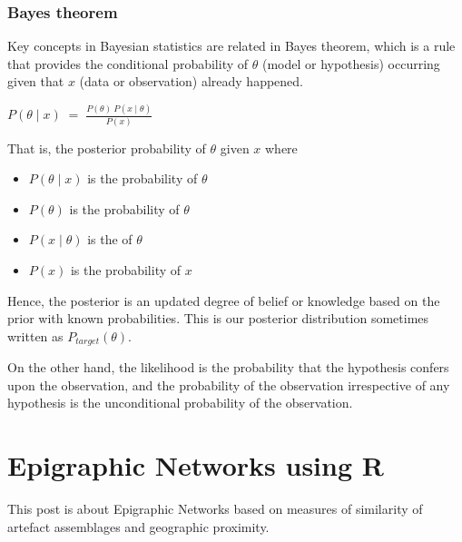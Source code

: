 \documentclass[a4paper,12pt,english]{sphinxhowto}
\begin{document}
\subsubsection{Bayes theorem}
\label{\detokenize{MCMC:bayes-theorem}}\label{\detokenize{MCMC:bayest}}
Key concepts in Bayesian statistics are related in Bayes theorem, which is a rule
that provides the conditional probability of \(\theta\) (model or hypothesis)
occurring given that \(x\) (data or observation) already happened.

\(P(\theta \mid x) \;=\; \frac{ P(\theta)~P(x \mid \theta)  } { P(x)  }\)

That is, the posterior probability of \(\theta\) given \(x\) where
\begin{itemize}
\item {} 
\(P(\theta \mid x)\) is the  probability of \(\theta\)

\item {} 
\(P(\theta)\) is the  probability of \(\theta\)

\item {} 
\(P(x \mid \theta)\) is the  of \(\theta\)

\item {} 
\(P(x)\) is the  probability of \(x\)

\end{itemize}

Hence, the posterior is an updated degree of belief or knowledge based on the prior
with known probabilities. This is our posterior  distribution sometimes written
as \(P_{target}(\theta)\).

On the other hand, the likelihood is the probability that the hypothesis confers upon
the observation, and the probability of the observation irrespective of any hypothesis
is the unconditional probability of the observation.



\section{Epigraphic Networks using R}
\label{\detokenize{EpigraphicNetwork:epigraphic-networks-using-r}}\label{\detokenize{EpigraphicNetwork:edh-net}}\label{\detokenize{EpigraphicNetwork::doc}}
This post is about Epigraphic Networks based on measures of similarity of artefact assemblages and geographic proximity.
\end{document}
